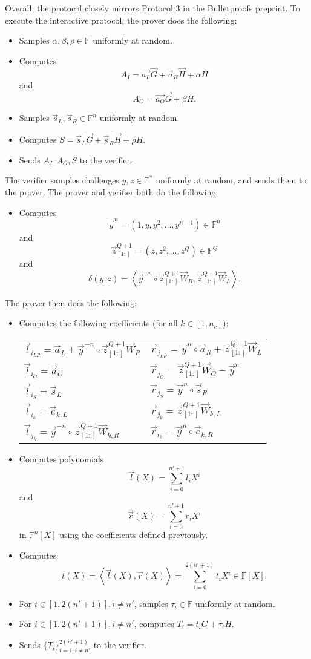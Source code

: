 \documentclass{article}
\newcommand{\FF}{\mathbb{F}}
\newcommand{\mat}[1]{\vec{#1}}
\newcommand{\zq}{\vec{z}^{Q+1}_{[1:]}}
\begin{document}
Overall, the protocol closely mirrors Protocol 3 in the Bulletproofs preprint.
To execute the interactive protocol, the prover does the following:
\begin{itemize}
	\item Samples $\alpha, \beta, \rho \in \FF$ uniformly at random.
	\item Computes
	$$A_I = \vec{a_L} \vec{G} + \vec{a}_R \vec{H} + \alpha H$$
	and
	$$A_O = \vec{a_O} \vec{G} + \beta H.$$
	\item Samples $\vec{s}_L, \vec{s}_R \in \FF^n$ uniformly at random.
	\item Computes $S = \vec{s}_L \vec{G} + \vec{s}_R \vec{H} + \rho H$.
	\item Sends $A_I, A_O, S$ to the verifier.
\end{itemize}
The verifier samples challenges $y, z \in \FF^*$ uniformly at random, and sends them to the prover.
The prover and verifier both do the following:
\begin{itemize}
	\item Computes
	$$\vec{y}^n = \left( 1, y, y^2, \ldots, y^{n-1} \right) \in \FF^n$$
	and
	$$\zq = \left( z, z^2, \ldots, z^Q \right) \in \FF^Q$$
	and
	$$\delta(y, z) = \left\langle \vec{y}^{-n} \circ \zq \mat{W}_R, \zq \mat{W}_L \right\rangle.$$
\end{itemize}
The prover then does the following:
\begin{itemize}
	\item Computes the following coefficients (for all $k \in [1, n_c]$):
	\begin{center}
		\begin{tabular}{ll}
		$\vec{l}_{i_{LR}} = \vec{a}_L + \vec{y}^{-n} \circ \zq \vec{W}_R$ & $\vec{r}_{j_{LR}} = \vec{y}^n \circ \vec{a}_R + \zq \vec{W}_L$ \\
		$\vec{l}_{i_O} = \vec{a}_O$ & $\vec{r}_{j_O} = \zq \vec{W}_O - \vec{y}^n$ \\
		$\vec{l}_{i_S} = \vec{s}_L$ & $\vec{r}_{j_S} = \vec{y}^n \circ \vec{s}_R$ \\
		$\vec{l}_{i_k} = \vec{c}_{k,L}$ & $\vec{r}_{j_k} = \zq \mat{W}_{k,L}$ \\
		$\vec{l}_{j_k} = \vec{y}^{-n} \circ \zq \mat{W}_{k,R}$ & $\vec{r}_{i_k} = \vec{y}^n \circ \vec{c}_{k,R}$
		\end{tabular}
	\end{center}		
	\item Computes polynomials
	$$\vec{l}(X) = \sum_{i=0}^{n' + 1} l_i X^i$$
	and
	$$\vec{r}(X) = \sum_{i=0}^{n' + 1} r_i X^i$$
	in $\FF^n[X]$ using the coefficients defined previously.
	\item Computes $$t(X) = \left\langle \vec{l}(X), \vec{r}(X) \right\rangle = \sum_{i=0}^{2(n' + 1)} t_i X^i \in \FF[X].$$
	\item For $i \in [1, 2(n' + 1)], i \neq n'$, samples $\tau_i \in \FF$ uniformly at random.
	\item For $i \in [1, 2(n' + 1)], i \neq n'$, computes $T_i = t_i G + \tau_i H$.
	\item Sends $\{ T_i \}_{i=1, i \neq n'}^{2(n' + 1)}$ to the verifier.
\end{itemize}
\end{document}
